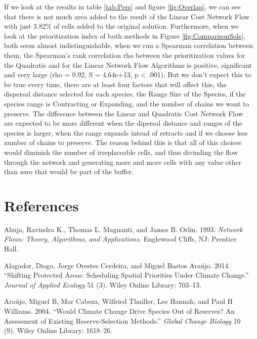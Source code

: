 \documentclass[]{article}
\begin{document}
If we look at the results in table \ref{tab:Pers} and figure \ref{fig:Overlap}, we can see that there is not much area added to the result of the Linear Cost Network Flow with just 3.82\% of cells added to the original solution. Furthermore, when we look at the prioritization index of both methods in Figure \ref{fig:ComparisonSols}, both seem almost indistinguishable, when we run a Spearman correlation between them, the Spearman's rank correlation rho between the prioritization values for the Quadratic and for the Linear Network Flow Algorithms is positive, significant and very large (rho = 0.92, S = 4.64e+13, p \textless{} .001). But we don't expect this to be true every time, there are at least four factors that will affect this, the dispersal distance selected for each species, the Range Size of the Species, if the species range is Contracting or Expanding, and the number of chains we want to preserve. The difference between the Linear and Quadratic Cost Network Flow are expected to be more different when the dipersal distance and ranges of the species is larger, when the range expands intead of retracts and if we choose less number of chains to preserve. The reason behind this is that all of this choices would diminish the number of irreplaceable cells, and thus divinding the flow through the network and generating more and more cells with any value other than zero that would be part of the buffer.

\hypertarget{references}{%
\section*{References}\label{references}}

\hypertarget{refs}{}
\leavevmode\hypertarget{ref-Ahuja93}{}%
Ahuja, Ravindra K., Thomas L. Magnanti, and James B. Orlin. 1993. \emph{Network Flows: Theory, Algorithms, and Applications}. Englewood Cliffs, NJ: Prentice Hall.

\leavevmode\hypertarget{ref-alagador2014shifting}{}%
Alagador, Diogo, Jorge Orestes Cerdeira, and Miguel Bastos Araújo. 2014. ``Shifting Protected Areas: Scheduling Spatial Priorities Under Climate Change.'' \emph{Journal of Applied Ecology} 51 (3). Wiley Online Library: 703--13.

\leavevmode\hypertarget{ref-araujo2004would}{}%
Araújo, Miguel B, Mar Cabeza, Wilfried Thuiller, Lee Hannah, and Paul H Williams. 2004. ``Would Climate Change Drive Species Out of Reserves? An Assessment of Existing Reserve-Selection Methods.'' \emph{Global Change Biology} 10 (9). Wiley Online Library: 1618--26.
\end{document}
